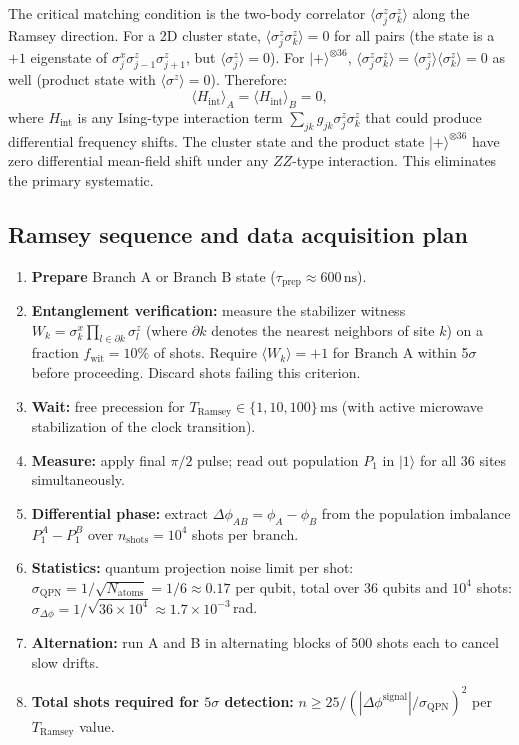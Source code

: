 \documentclass[12pt,letterpaper]{article}
\theoremstyle{plain}
\theoremstyle{definition}
\begin{document}
The critical matching condition is the two-body correlator $\langle\sigma^z_j\sigma^z_k\rangle$ along the Ramsey direction.  For a 2D cluster state, $\langle\sigma^z_j\sigma^z_k\rangle = 0$ for all pairs (the state is a $+1$ eigenstate of $\sigma^x_j\sigma^z_{j-1}\sigma^z_{j+1}$, but $\langle\sigma^z_j\rangle = 0$).  For $|+\rangle^{\otimes 36}$, $\langle\sigma^z_j\sigma^z_k\rangle = \langle\sigma^z_j\rangle\langle\sigma^z_k\rangle = 0$ as well (product state with $\langle\sigma^z\rangle = 0$).  Therefore:
\begin{equation}
  \langle H_{\mathrm{int}}\rangle_A = \langle H_{\mathrm{int}}\rangle_B = 0,
  \label{eq:matched-energy}
\end{equation}
where $H_{\mathrm{int}}$ is any Ising-type interaction term $\sum_{jk}g_{jk}\sigma^z_j\sigma^z_k$ that could produce differential frequency shifts.  The cluster state and the product state $|+\rangle^{\otimes 36}$ have zero differential mean-field shift under any $ZZ$-type interaction.  This eliminates the primary systematic.

\subsection{Ramsey sequence and data acquisition plan}

\begin{enumerate}[label=\textbf{R\arabic*.},leftmargin=3em]
\item \textbf{Prepare} Branch A or Branch B state ($\tau_{\mathrm{prep}} \approx 600\,\text{ns}$).
\item \textbf{Entanglement verification:} measure the stabilizer witness $W_k = \sigma^x_k\prod_{l \in \partial k}\sigma^z_l$ (where $\partial k$ denotes the nearest neighbors of site $k$) on a fraction $f_{\mathrm{wit}} = 10\%$ of shots. Require $\langle W_k\rangle = +1$ for Branch A within 5$\sigma$ before proceeding. Discard shots failing this criterion.
\item \textbf{Wait:} free precession for $T_{\mathrm{Ramsey}} \in \{1, 10, 100\}\,\text{ms}$ (with active microwave stabilization of the clock transition).
\item \textbf{Measure:} apply final $\pi/2$ pulse; read out population $P_1$ in $|1\rangle$ for all 36 sites simultaneously.
\item \textbf{Differential phase:} extract $\Delta\phi_{AB} = \phi_A - \phi_B$ from the population imbalance $P_1^A - P_1^B$ over $n_{\mathrm{shots}} = 10^4$ shots per branch.
\item \textbf{Statistics:} quantum projection noise limit per shot: $\sigma_{\mathrm{QPN}} = 1/\sqrt{N_{\mathrm{atoms}}} = 1/6 \approx 0.17$ per qubit, total over 36 qubits and $10^4$ shots: $\sigma_{\Delta\phi} = 1/\sqrt{36 \times 10^4} \approx 1.7\times10^{-3}$\,rad.
\item \textbf{Alternation:} run A and B in alternating blocks of 500 shots each to cancel slow drifts.
\item \textbf{Total shots required for $5\sigma$ detection:} $n \geq 25/(|\Delta\phi^{\mathrm{signal}}|/\sigma_{\mathrm{QPN}})^2$ per $T_{\mathrm{Ramsey}}$ value.
\end{enumerate}
\end{document}
